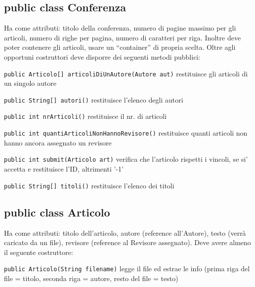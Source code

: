 \documentclass[a4paper]{article}
\begin{document}
\subsection*{public class Conferenza}

Ha come attributi: titolo della conferenza, numero di pagine massimo per gli 
articoli, numero di righe per pagina, numero di caratteri per riga.
Inoltre deve poter contenere gli articoli, usare un ``container'' di propria 
scelta.
Oltre agli opportuni costruttori deve disporre dei seguenti metodi pubblici:

\begin{compactitem}


\item\texttt{public Articolo[] articoliDiUnAutore(Autore aut)}
restituisce gli articoli di un singolo autore

\item\texttt{public String[] autori()}
restituisce l'elenco degli autori


\item\texttt{public int 	nrArticoli()}
restituisce il nr. di articoli

\item\texttt{public int quantiArticoliNonHannoRevisore()}
restituisce quanti articoli non hanno ancora assegnato un revisore

\item\texttt{public int submit(Articolo art)}
verifica che l'articolo rispetti i vincoli, se si' accetta e restituisce l'ID, 
altrimenti '-1'


\item\texttt{public String[] titoli()}
restituisce l'elenco dei titoli



\end{compactitem}


\subsection*{public class Articolo}

Ha come attributi: titolo dell'articolo, autore (reference all'Autore), testo 
(verrà caricato da un file), revisore (reference al Revisore assegnato).
Deve avere almeno il seguente costruttore:

\begin{compactitem} 


\item \texttt{public Articolo(String filename)}
legge il file ed estrae le info (prima riga del file = titolo,  seconda 
riga = autore, resto del file = testo)


\end{compactitem} 
\end{document}
